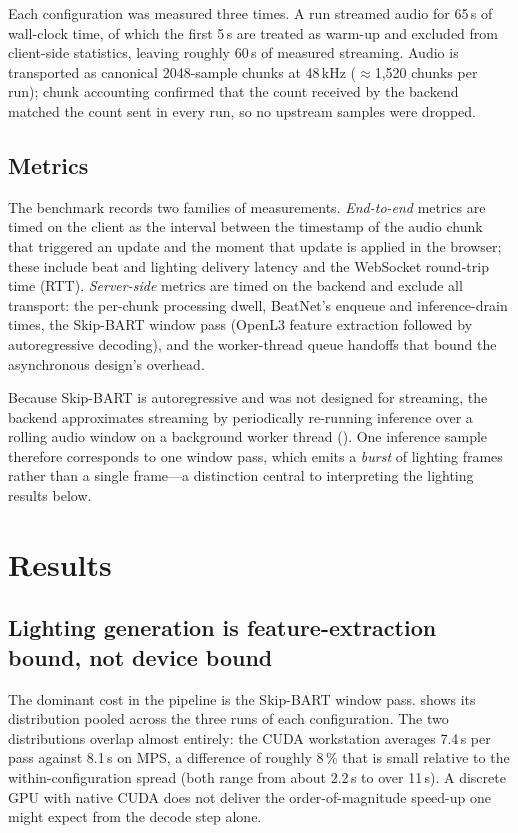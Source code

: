 Each configuration was measured three times. A run streamed audio for 65\,s of wall-clock time, of which the first 5\,s are treated as warm-up and excluded from client-side statistics, leaving roughly 60\,s of measured streaming. Audio is transported as canonical 2048-sample chunks at 48\,kHz ($\approx$1{,}520 chunks per run); chunk accounting confirmed that the count received by the backend matched the count sent in every run, so no upstream samples were dropped.

\subsection{Metrics}

The benchmark records two families of measurements. \emph{End-to-end} metrics are timed on the client as the interval between the timestamp of the audio chunk that triggered an update and the moment that update is applied in the browser; these include beat and lighting delivery latency and the WebSocket round-trip time (RTT). \emph{Server-side} metrics are timed on the backend and exclude all transport: the per-chunk processing dwell, BeatNet's enqueue and inference-drain times, the Skip-BART window pass (OpenL3 feature extraction followed by autoregressive decoding), and the worker-thread queue handoffs that bound the asynchronous design's overhead.

Because Skip-BART is autoregressive and was not designed for streaming, the backend approximates streaming by periodically re-running inference over a rolling audio window on a background worker thread (). One inference sample therefore corresponds to one window pass, which emits a \emph{burst} of lighting frames rather than a single frame---a distinction central to interpreting the lighting results below.

\section{Results}
\label{sec:eval-results}

\subsection{Lighting generation is feature-extraction bound, not device bound}

The dominant cost in the pipeline is the Skip-BART window pass.  shows its distribution pooled across the three runs of each configuration. The two distributions overlap almost entirely: the CUDA workstation averages 7.4\,s per pass against 8.1\,s on MPS, a difference of roughly 8\,\% that is small relative to the within-configuration spread (both range from about 2.2\,s to over 11\,s). A discrete GPU with native CUDA does not deliver the order-of-magnitude speed-up one might expect from the decode step alone.

